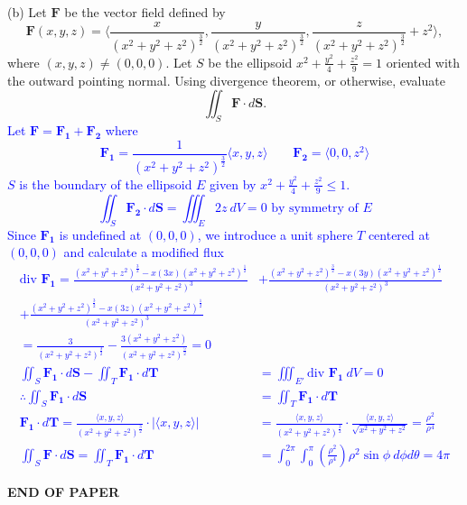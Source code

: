 \documentclass[12pt]{article}
\begin{document}
\newpage
(b) Let $\mathbf{F}$ be the vector field defined by
\[
\mathbf{F}(x,y,z)=\Bigg\langle\frac{x}{(x^2+y^2+z^2)^{\frac{3}{2}}},\frac{y}{(x^2+y^2+z^2)^{\frac{3}{2}}},\frac{z}{(x^2+y^2+z^2)^{\frac{3}{2}}}+z^2\Bigg\rangle,
\]
where $(x,y,z)\neq(0,0,0)$. Let $S$ be the ellipsoid $x^2+\frac{y^2}{4}+\frac{z^2}{9}=1$ oriented with the outward pointing normal. Using divergence theorem, or otherwise, evaluate
\[
\iint_S\mathbf{F}\cdot d\mathbf{S}.
\]
\textcolor{blue}{
Let $\mathbf{F}=\mathbf{F_1}+\mathbf{F_2}$ where
\[
\mathbf{F_1}=\frac{1}{(x^2+y^2+z^2)^\frac{3}{2}}\langle x,y,z\rangle\qquad\mathbf{F_2}=\langle0,0,z^2\rangle
\]
$S$ is the boundary of the ellipsoid $E$ given by $x^2+\frac{y^2}{4}+\frac{z^2}{9}\leq1$.
\[
	\iint_S\mathbf{F_2}\cdot d\mathbf{S}=\iiint_E2z\ dV=0\text{ by symmetry of }E
\]
Since $\mathbf{F_1}$ is undefined at $(0,0,0)$, we introduce a unit sphere $T$ centered at $(0,0,0)$ and calculate a modified flux
\begin{align*}
	\text{div }\mathbf{F_1}=\frac{(x^2+y^2+z^2)^\frac{3}{2}-x(3x)(x^2+y^2+z^2)^\frac{1}{2}}{(x^2+y^2+z^2)^3}&+\frac{(x^2+y^2+z^2)^\frac{3}{2}-x(3y)(x^2+y^2+z^2)^\frac{1}{2}}{(x^2+y^2+z^2)^3}\\
	+\frac{(x^2+y^2+z^2)^\frac{3}{2}-x(3z)(x^2+y^2+z^2)^\frac{1}{2}}{(x^2+y^2+z^2)^3}\\
	=\frac{3}{(x^2+y^2+z^2)^\frac{3}{2}}-\frac{3(x^2+y^2+z^2)}{(x^2+y^2+z^2)^\frac{5}{2}}=0\\
	\iint_S\mathbf{F_1}\cdot d\mathbf{S}-\iint_T\mathbf{F_1}\cdot d\mathbf{T}&=\iiint_{E'}\text{div }\mathbf{F_1}\ dV=0\\
	\therefore\iint_S\mathbf{F_1}\cdot d\mathbf{S}&=\iint_T\mathbf{F_1}\cdot d\mathbf{T}\\
	\mathbf{F_1}\cdot d\mathbf{T}=\frac{\langle x,y,z\rangle}{(x^2+y^2+z^2)^\frac{3}{2}}\cdot|\langle x,y,z\rangle|&=\frac{\langle x,y,z\rangle}{(x^2+y^2+z^2)^\frac{3}{2}}\cdot\frac{\langle x,y,z\rangle}{\sqrt{x^2+y^2+z^2}}=\frac{\rho^2}{\rho^4}\\
	\iint_S\mathbf{F}\cdot d\mathbf{S}=\iint_T\mathbf{F_1}\cdot d\mathbf{T}&=\int_0^{2\pi}\int_0^{\pi}\left(\frac{\rho^2}{\rho^4}\right)\rho^2\sin\phi\ d\phi d\theta=4\pi
\end{align*}
}



\begin{center}
	\textbf{END OF PAPER}
\end{center}
\end{document}
